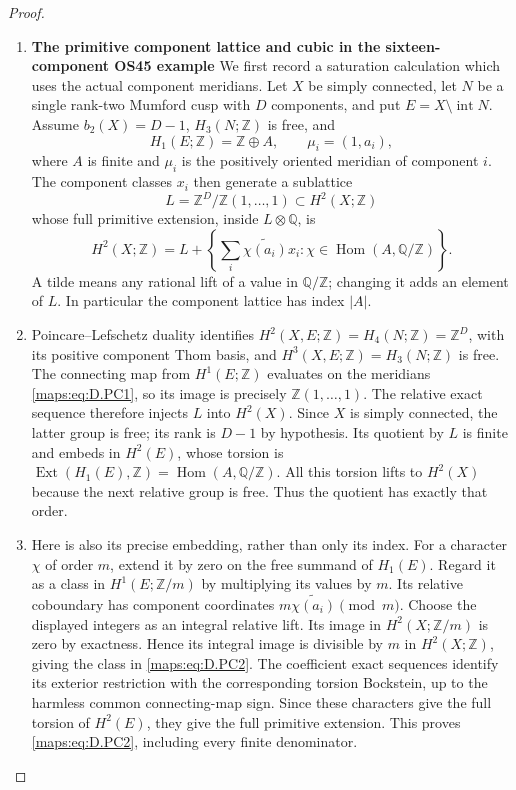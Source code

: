 \begin{proof}
\begin{enumerate}[label=\arabic*.,leftmargin=*]
\item \textbf{The primitive component lattice and cubic in the sixteen-component OS45 example}
We first record a saturation calculation which uses the actual component
meridians. Let $X$ be simply connected, let $N$ be a single rank-two
Mumford cusp with $D$ components, and put $E=X\setminus\operatorname{int}N$.
Assume $b_2(X)=D-1$, $H_3(N;\mathbb Z)$ is free, and
\[
 H_1(E;\mathbb Z)=\mathbb Z\oplus A,\qquad
                       \mu_i=(1,a_i),                      \tag{D.PC1}\label{maps:eq:D.PC1}
\]
where $A$ is finite and $\mu_i$ is the positively oriented meridian of
component $i$. The component classes $x_i$ then generate a sublattice
\[
 L=\mathbb Z^D/\mathbb Z(1,\ldots,1)
                       \subset H^2(X;\mathbb Z)
\]
whose full primitive extension, inside $L\otimes\mathbb Q$, is
\[
 H^2(X;\mathbb Z)
   =L+\left\{\sum_i\widetilde{\chi(a_i)}x_i:
                         \chi\in\operatorname{Hom}(A,\mathbb Q/\mathbb Z)
        \right\}.                                        \tag{D.PC2}\label{maps:eq:D.PC2}
\]
A tilde means any rational lift of a value in $\mathbb Q/\mathbb Z$;
changing it adds an element of $L$. In particular the component
lattice has index $|A|$.

\item Poincare--Lefschetz duality identifies
$H^2(X,E;\mathbb Z)=H_4(N;\mathbb Z)=\mathbb Z^D$,
with its positive component Thom basis, and
$H^3(X,E;\mathbb Z)=H_3(N;\mathbb Z)$ is free. The connecting
map from $H^1(E;\mathbb Z)$ evaluates on the meridians \eqref{maps:eq:D.PC1},
so its image is precisely $\mathbb Z(1,\ldots,1)$.
The relative exact sequence therefore injects $L$ into $H^2(X)$.
Since $X$ is simply connected, the latter group is free; its rank is
$D-1$ by hypothesis. Its quotient by $L$ is finite and embeds in
$H^2(E)$, whose torsion is
$\operatorname{Ext}(H_1(E),\mathbb Z)=\operatorname{Hom}(A,\mathbb Q/\mathbb Z)$.
All this torsion lifts to $H^2(X)$ because the next relative group is
free. Thus the quotient has exactly that order.

\item Here is also its precise embedding, rather than only its index.
For a character $\chi$ of order $m$, extend it by zero on the free
summand of $H_1(E)$. Regard it as a class in
$H^1(E;\mathbb Z/m)$ by multiplying its values by $m$.
Its relative coboundary has component coordinates
$m\widetilde{\chi(a_i)}\pmod m$. Choose the displayed integers
as an integral relative lift. Its image in $H^2(X;\mathbb Z/m)$
is zero by exactness. Hence its integral image is divisible by $m$
in $H^2(X;\mathbb Z)$, giving the class in \eqref{maps:eq:D.PC2}.
The coefficient exact sequences identify its exterior restriction
with the corresponding torsion Bockstein, up to the harmless common
connecting-map sign. Since these characters give the full torsion
of $H^2(E)$, they give the full primitive extension. This proves
\eqref{maps:eq:D.PC2}, including every finite denominator.


\end{enumerate}
\end{proof}
